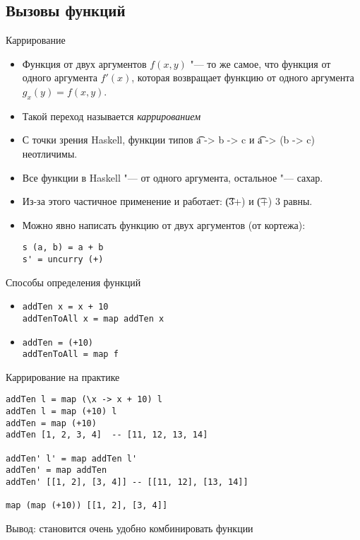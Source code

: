 \subsection{Вызовы функций}

\begin{frame}[fragile]{Каррирование}
	\begin{itemize}
		\item Функция от двух аргументов $f(x, y)$ "--- то же самое, что функция от одного аргумента $f'(x)$,
			которая возвращает функцию от одного аргумента $g_x(y)=f(x, y)$.
		\item Такой переход называется \textit{каррированием}
		\item С точки зрения Haskell, функции типов \t{a -> b -> c} и \t{a -> (b -> c)} неотличимы.
		\item Все функции в Haskell "--- от одного аргумента, остальное "--- сахар.
		\item Из-за этого частичное применение и работает: \t{(3+)} и \t{(+) 3} равны.
		\item Можно явно написать функцию от двух аргументов (от кортежа):
\begin{verbatim}
s (a, b) = a + b
s' = uncurry (+)
\end{verbatim}
	\end{itemize}
\end{frame}

\begin{frame}[fragile]{Способы определения функций}
	\begin{itemize}
		\item
\begin{verbatim}
addTen x = x + 10
addTenToAll x = map addTen x
\end{verbatim}
		\item
\begin{verbatim}
addTen = (+10)
addTenToAll = map f
\end{verbatim}
	\end{itemize}
\end{frame}

\begin{frame}[fragile]{Каррирование на практике}
	\begin{verbatim}
addTen l = map (\x -> x + 10) l
addTen l = map (+10) l
addTen = map (+10)
addTen [1, 2, 3, 4]  -- [11, 12, 13, 14]

addTen' l' = map addTen l'
addTen' = map addTen
addTen' [[1, 2], [3, 4]] -- [[11, 12], [13, 14]]

map (map (+10)) [[1, 2], [3, 4]]
	\end{verbatim}
	Вывод: становится очень удобно комбинировать функции
\end{frame}

